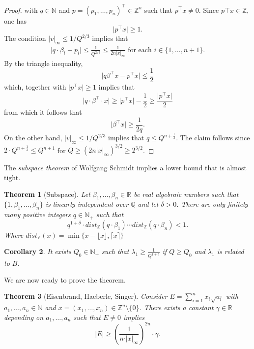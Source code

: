 \documentclass[a4paper,11pt,american]{article}
\newcommand{\N}{\mathbb{N}}
\newcommand{\Q}{\mathbb{Q}}
\newcommand{\R}{\mathbb{R}}
\newcommand{\Z}{\mathbb{Z}}
\theoremstyle{plain}
\newtheorem{theorem}{Theorem}
\newtheorem{corollary}[theorem]{Corollary}
\theoremstyle{definition}
\begin{document}
\begin{proof}
with $q \in \N$ and $p = (p_1,\dots,p_n)^\top  \in \Z^n$ such that $p^\top  x \neq0$. Since $p\top x \in \Z$, one has
\begin{equation}
  \label{eq:10}
  \vert p^\top x\vert  \geq1.
\end{equation}
The condition $\vert v\vert _\infty \leq 1/Q^{2/3}$ implies that
\begin{eqnarray*}
  \vert q \cdot \beta_i - p_i\vert  \leq   \frac{1}{Q^{2/3}} \leq \frac{1}{2 n \vert x\vert _\infty}  \text{  for each  } i \in\{1,\dots,n+1\}.
\end{eqnarray*}
By the triangle inequality, 
\begin{displaymath}
 \vert q \beta^\top  x - p^\top  x \vert  \leq \frac12
\end{displaymath}
which, together with $\vert p^\top  x\vert \geq1$ implies that \begin{equation*}
    \vert q\cdot\beta^\top\cdot x\vert\geq \vert p^\top  x\vert-\frac{1}{2}\geq \frac{\vert p^\top  x\vert}{2}
\end{equation*}
from which it follows that
\begin{equation*}
  \vert \beta^\top  x \vert  \geq \frac{1}{2 q}.
\end{equation*}
%
On the other hand, $\vert v\vert _\infty \leq 1/ Q^{2/3}$ implies that $q \leq Q^{n+\frac{1}{3}}$. The claim follows since $2 \cdot Q^{n+\frac{1}{3}} \leq Q^{n+1}$ for $Q \geq (2 n \vert x\vert _\infty)^{3/2}\geq 2^{3/2}$.
\end{proof}

The \emph{subspace theorem} of Wolfgang Schmidt implies a lower bound that is almost tight. 
\begin{theorem}[Subspace]
  \label{thr:7}
  Let $\beta_1,\dots,\beta_n \in \R$ be real algebraic numbers such that $\{1,\beta_1,\dots,\beta_n\}$ is linearly independent over $\Q$ and let $\delta>0$. There are only finitely many positive integers $q \in \N_+$ such that
  \begin{displaymath}
    q^{1+\delta} \cdot dist_\Z(q\cdot\beta_1) \cdots dist_\Z(q\cdot\beta_n) <1. 
  \end{displaymath}
  Where $dist_\Z(x)=\min\{x-\lfloor x\rfloor,\lceil x\rceil\}$
\end{theorem}
\begin{corollary}
    It exists $Q_0\in\N_+$ such that $\lambda_1\geq \frac{1}{Q^{1+\delta}}$ if $Q\geq Q_0$ and $\lambda_1$ is related to $B$. 
\end{corollary}
We are now ready to prove the theorem.
\begin{theorem}[Eisenbrand, Haeberle, Singer]
  \label{thr:6}
  Consider $ E = \sum_{i=1}^n x_i \sqrt{a_i}$ with  
  $a_1,\dots,a_n\in \N$  and  $x = (x_1,\dots,x_n)\in\Z^n\setminus\{0\}$. There exists a constant $\gamma \in \R$ depending on $a_1,\dots,a_n$ such that $E \neq0$ implies
  \begin{equation}
    \label{eq:12}
    \vert E\vert  \geq  \left( \frac{1}{n \cdot \vert x\vert _\infty}\right)^{2n} \cdot \gamma. 
  \end{equation}
\end{theorem}
\end{document}
